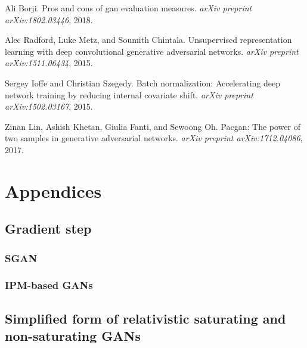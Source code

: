 \documentclass{article}
\begin{document}
\begin{thebibliography}{25}
	Ali Borji.
	\newblock Pros and cons of gan evaluation measures.
	\newblock \emph{arXiv preprint arXiv:1802.03446}, 2018.
	
	Alec Radford, Luke Metz, and Soumith Chintala.
	\newblock Unsupervised representation learning with deep convolutional
	generative adversarial networks.
	\newblock \emph{arXiv preprint arXiv:1511.06434}, 2015.
	
	Sergey Ioffe and Christian Szegedy.
	\newblock Batch normalization: Accelerating deep network training by reducing
	internal covariate shift.
	\newblock \emph{arXiv preprint arXiv:1502.03167}, 2015.
	
	Zinan Lin, Ashish Khetan, Giulia Fanti, and Sewoong Oh.
	\newblock Pacgan: The power of two samples in generative adversarial networks.
	\newblock \emph{arXiv preprint arXiv:1712.04086}, 2017.
	
\end{thebibliography}


\appendix
\section*{Appendices}
\renewcommand{\thesubsection}{\Alph{subsection}}

\subsection{Gradient step}

\subsubsection{SGAN}






\subsubsection{IPM-based GANs}





\subsection{Simplified form of relativistic saturating and non-saturating GANs}
\end{document}
